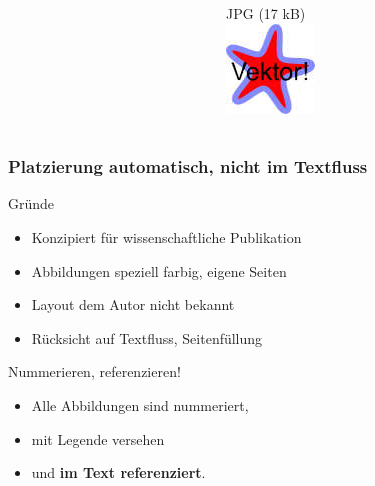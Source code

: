 \documentclass{beamer}
\begin{document}
\begin{frame}
\begin{columns}[onlytextwidth]
\begin{column}{0.33\textwidth}
		\end{column}
		\begin{column}{0.33\textwidth}
		  \centering
			JPG (17 kB)\\[5mm]
			\includegraphics[width=\textwidth]{images/vektor.jpg}
		\end{column}
	\end{columns}
\end{frame}

\begin{frame}
	\frametitle{Platzierung automatisch, nicht im Textfluss}
	\begin{block}{Gründe}
		\begin{itemize}
			\item Konzipiert für wissenschaftliche Publikation
			\item Abbildungen speziell farbig, eigene Seiten
			\item Layout dem Autor nicht bekannt
			\item Rücksicht auf Textfluss, Seitenfüllung
		\end{itemize}
	\end{block}
	\begin{alertblock}{Nummerieren, referenzieren!}
		\begin{itemize}
			\item Alle Abbildungen sind nummeriert,\\
		 	\item mit Legende versehen\\
			\item und {\bf im Text referenziert}.
		\end{itemize}
	\end{alertblock}
\end{frame}
\end{document}
